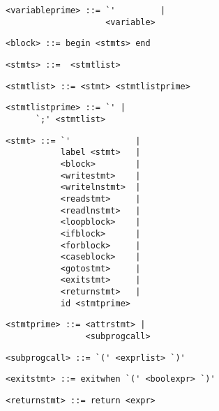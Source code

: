 \begin{footnotesize}
\begin{lstlisting}[frame=single, label={variableprime}, language=pie]
<variableprime> ::= `'         |
                    <variable> 
\end{lstlisting}

\begin{lstlisting}[frame=single, label={block}, language=pie]
<block> ::= begin <stmts> end
\end{lstlisting}

\begin{lstlisting}[frame=single, label={stmts}, language=pie]
<stmts> ::=  <stmtlist>
\end{lstlisting}

\begin{lstlisting}[frame=single, label={stmtlist}, language=pie]
<stmtlist> ::= <stmt> <stmtlistprime>
\end{lstlisting}

\begin{lstlisting}[frame=single, label={stmtlistprime}, language=pie]
<stmtlistprime> ::= `' |
      `;' <stmtlist>
\end{lstlisting}

\begin{lstlisting}[frame=single, label={stmt}, language=pie]
<stmt> ::= `'             | 
           label <stmt>   |
           <block>        |
           <writestmt>    |
           <writelnstmt>  |
           <readstmt>     |
           <readlnstmt>   |
           <loopblock>    |
           <ifblock>      |
           <forblock>     |
           <caseblock>    |
           <gotostmt>     |
           <exitstmt>     |
           <returnstmt>   |
           id <stmtprime>
\end{lstlisting}

\begin{lstlisting}[frame=single, label={stmtprime}, language=pie]
<stmtprime> ::= <attrstmt> |
                <subprogcall>
\end{lstlisting}

\begin{lstlisting}[frame=single, label={subprogcall}, language=pie]
<subprogcall> ::= `(' <exprlist> `)'
\end{lstlisting}

\begin{lstlisting}[frame=single, label={exitstmt}, language=pie]
<exitstmt> ::= exitwhen `(' <boolexpr> `)'
\end{lstlisting}

\begin{lstlisting}[frame=single, label={returnstmt}, language=pie]
<returnstmt> ::= return <expr>
\end{lstlisting}


\end{footnotesize}
